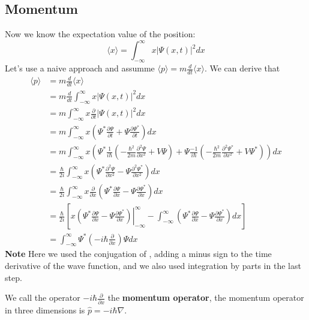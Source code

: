 \documentclass[a4paper,12pt]{article}
\begin{document}
\subsection{Momentum}
Now we know the expectation value of the position:
$$\langle x \rangle = \int_{-\infty}^{\infty} x |\Psi(x,t)|^2 dx$$
Let's use a naive approach and assumme $\langle p \rangle = m \frac{d}{dt} \langle x \rangle$. We can derive that
\begin{align*}
    \langle p \rangle &= m \frac{d}{dt} \langle x \rangle \\
    &= m \frac{d}{dt} \int_{-\infty}^{\infty} x |\Psi(x,t)|^2 dx \\
    &= m \int_{-\infty}^{\infty} x \frac{\partial}{\partial t} |\Psi(x,t)|^2 dx \\
    &= m \int_{-\infty}^{\infty} x \left( \Psi^* \frac{\partial \Psi}{\partial t} + \Psi \frac{\partial \Psi^*}{\partial t} \right) dx\\
    &= m \int_{-\infty}^{\infty} x \left( \Psi^* \frac{1}{i \hbar} \left( -\frac{\hbar^2}{2m} \frac{\partial^2 \Psi}{\partial x^2} + V \Psi \right) + \Psi \frac{-1}{i \hbar} \left( -\frac{\hbar^2}{2m} \frac{\partial^2 \Psi^*}{\partial x^2} + V \Psi^* \right) \right) dx\\
    &= \frac{\hbar}{2i} \int_{-\infty}^{\infty} x \left( \Psi^* \frac{\partial^2 \Psi}{\partial x^2} - \Psi \frac{\partial^2 \Psi^*}{\partial x^2} \right) dx\\
    &= \frac{\hbar}{2i} \int_{-\infty}^{\infty} x \frac{\partial}{\partial x}\left( \Psi^* \frac{\partial \Psi}{\partial x} - \Psi \frac{\partial \Psi^*}{\partial x} \right) dx\\
    &= \frac{\hbar}{2i} \left[ \left. x \left( \Psi^* \frac{\partial \Psi}{\partial x} - \Psi \frac{\partial \Psi^*}{\partial x} \right) \right|_{-\infty}^{\infty} - \int_{-\infty}^{\infty} \left( \Psi^* \frac{\partial \Psi}{\partial x} - \Psi \frac{\partial \Psi^*}{\partial x} \right) dx \right] \\
    &= \int_{- \infty}^{\infty} \Psi^* \left( -i\hbar \frac{\partial}{\partial x} \right) \Psi dx
\end{align*}
\textbf{Note} Here we used the conjugation of , adding a minus sign to the time derivative of the wave function, and we also used integration by parts in the last step.

We call the operator $-i\hbar \frac{\partial}{\partial x}$ the \textbf{momentum operator}, the momentum operator in three dimensions is $\hat{p} = -i\hbar \nabla$.
\end{document}
